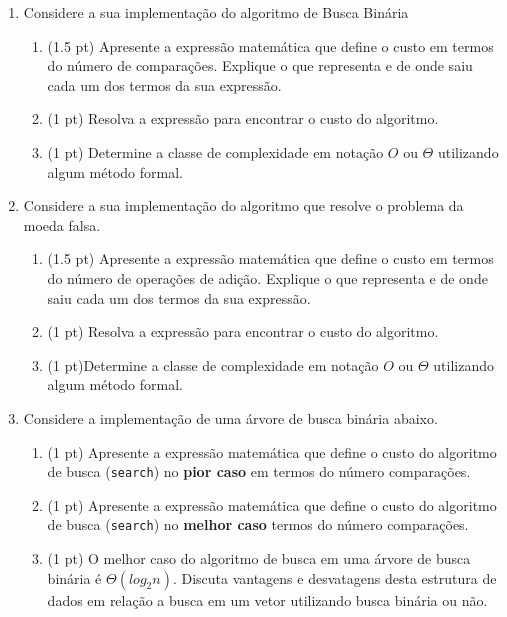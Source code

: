 \documentclass{article}
\begin{document}
\begin{enumerate}
    
    \item Considere a sua implementação do algoritmo de Busca Binária

    \begin{enumerate}
        \item (1.5 pt) Apresente a expressão matemática que define o custo em termos do número de comparações. Explique o que representa e de onde saiu cada um dos termos da sua expressão. 
        \item (1 pt) Resolva a expressão para encontrar o custo do algoritmo.
        \item (1 pt) Determine a classe de complexidade em notação $O$ ou $\Theta$ utilizando algum método formal. 
    \end{enumerate}
    
    \item Considere a sua implementação do algoritmo que resolve o problema da moeda falsa.
    \begin{enumerate}
        \item (1.5 pt) Apresente a expressão matemática que define o custo em termos do número de operações de adição. Explique o que representa e de onde saiu cada um dos termos da sua expressão. 
        \item (1 pt) Resolva a expressão para encontrar o custo do algoritmo.
        \item (1 pt)Determine a classe de complexidade em notação $O$ ou $\Theta$ utilizando algum método formal. 
    \end{enumerate}

    \item Considere a implementação de uma árvore de busca binária abaixo.
    
    

    \begin{enumerate}
        \item (1 pt) Apresente a expressão matemática que define o custo do algoritmo de busca (\texttt{search}) no \textbf{pior caso} em termos do número comparações. 
        \item (1 pt) Apresente a expressão matemática que define o custo do algoritmo de busca (\texttt{search}) no \textbf{melhor caso} termos do número comparações.
        \item (1 pt) O melhor caso do algoritmo de busca em uma árvore de busca binária é $\Theta(log_2n)$. Discuta vantagens e desvatagens desta estrutura de dados em relação a busca em um vetor utilizando busca binária ou não.  
    \end{enumerate}

\end{enumerate}



%
%
\end{document}
